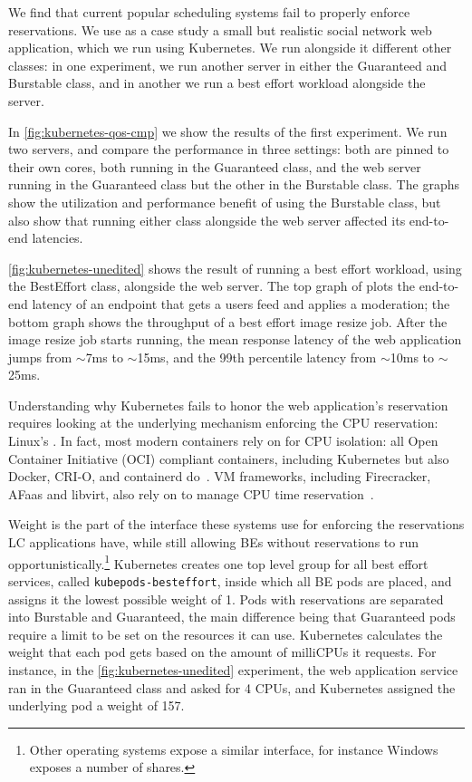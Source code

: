 We find that current popular scheduling systems fail to properly enforce
reservations. We use as a case study a small but realistic social network web
application, which we run using Kubernetes. We run alongside it different other
classes: in one experiment, we run another server in either the Guaranteed and
Burstable class, and in another we run a best effort workload alongside the
server. 

In \autoref{fig:kubernetes-qos-cmp} we show the results of the first experiment.
We run two servers, and compare the performance in three settings: both are
pinned to their own cores, both running in the Guaranteed class, and the web
server running in the Guaranteed class but the other in the Burstable class. The
graphs show the utilization and performance benefit of using the Burstable
class, but also show that running either class alongside the web server affected
its end-to-end latencies.

\autoref{fig:kubernetes-unedited} shows the result of running a best effort
workload, using the BestEffort class, alongside the web server. The top graph of
plots the end-to-end latency of an endpoint that gets a users feed and applies a
moderation; the bottom graph shows the throughput of a best effort image resize
job. After the image resize job starts running, the mean response latency of the
web application jumps from $\sim$7ms to $\sim$15ms, and the 99th percentile
latency from $\sim$10ms to $\sim$25ms.


Understanding why Kubernetes fails to honor the web application's reservation
requires looking at the underlying mechanism enforcing the CPU reservation:
Linux's \cgroups{}. In fact, most modern containers rely on \cgroups{} for CPU
isolation: all Open Container Initiative (OCI) compliant containers, including
Kubernetes but also Docker, CRI-O, and containerd
do~\cite{oci-cgroups,docker-docs-cgroups,container-isolation-article}. VM
frameworks, including Firecracker, AFaas and libvirt, also rely on \cgroups{} to
manage CPU time reservation~\cite{firecracker-cgroups,afaas,libvirt-cgroups}.

Weight is the part of the \cgroups{} interface these systems use for enforcing
the reservations LC applications have, while still allowing BEs without
reservations to run opportunistically.\footnote{Other operating systems expose a
similar interface, for instance Windows exposes a number of shares.} Kubernetes
creates one top level group for all best effort services, called
\texttt{kubepods-besteffort}, inside which all BE pods are placed, and assigns
it the lowest possible weight of 1. Pods with reservations are separated into
Burstable and Guaranteed, the main difference being that Guaranteed pods require
a limit to be set on the resources it can use. Kubernetes calculates the weight
that each pod gets based on the amount of milliCPUs it requests. For instance,
in the \autoref{fig:kubernetes-unedited} experiment, the web application service
ran in the Guaranteed class and asked for 4 CPUs, and Kubernetes assigned the
underlying pod a weight of 157.

